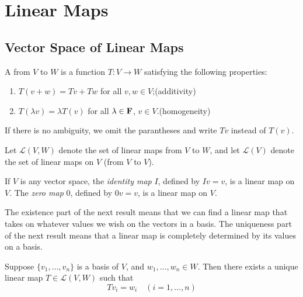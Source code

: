 \chapter{Linear Maps}\label{chap:linear-maps}
\section{Vector Space of Linear Maps}
\begin{definition}
A  from $V$ to $W$ is a function $T\colon V\to W$ satisfying the following properties:
\begin{enumerate}[label=(\roman*)]
\item $T(v+w)=Tv+Tw$ for all $v,w\in V$;\hfill(additivity)
\item $T(\lambda v)=\lambda T(v)$ for all $\lambda\in\mathbf F$, $v\in V$.\hfill(homogeneity)
\end{enumerate}
\end{definition}

\begin{notation}
If there is no ambiguity, we omit the parantheses and write $Tv$ instead of $T(v)$.
\end{notation}

\begin{notation}
Let $\mathcal{L}(V,W)$ denote the set of linear maps from $V$ to $W$, and let $\mathcal{L}(V)$ denote the set of linear maps on $V$ (from $V$ to $V$).
\end{notation}

\begin{example}
If $V$ is any vector space, the \emph{identity map} $I$, defined by $Iv=v$, is a linear map on $V$. The \emph{zero map} $0$, defined by $0v=v$, is a linear map on $V$.
\end{example}

The existence part of the next result means that we can find a linear map that takes on whatever values we wish on the vectors in a basis. 
The uniqueness part of the next result means that a linear map is completely determined by its values on a basis.

\begin{lemma}
Suppose $\{v_1,\dots,v_n\}$ is a basis of $V$, and $w_1,\dots,w_n\in W$. Then there exists a unique linear map $T\in\mathcal{L}(V,W)$ such that
\[Tv_i=w_i\quad(i=1,\dots,n)\]
\end{lemma}

